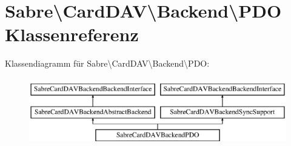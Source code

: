 \hypertarget{class_sabre_1_1_card_d_a_v_1_1_backend_1_1_p_d_o}{}\section{Sabre\textbackslash{}Card\+D\+AV\textbackslash{}Backend\textbackslash{}P\+DO Klassenreferenz}
\label{class_sabre_1_1_card_d_a_v_1_1_backend_1_1_p_d_o}
Klassendiagramm für Sabre\textbackslash{}Card\+D\+AV\textbackslash{}Backend\textbackslash{}P\+DO\+:\begin{figure}[H]
\begin{center}
\leavevmode
\includegraphics[height=3.000000cm]{class_sabre_1_1_card_d_a_v_1_1_backend_1_1_p_d_o}
\end{center}
\end{figure}
